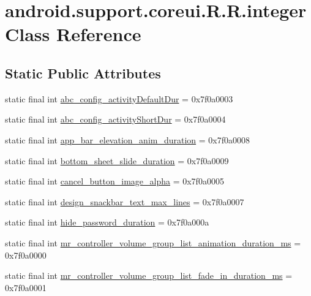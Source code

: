 \hypertarget{classandroid_1_1support_1_1coreui_1_1_r_1_1integer}{
\section{android.support.coreui.R.R.integer Class Reference}
\label{classandroid_1_1support_1_1coreui_1_1_r_1_1integer}
}
\subsection*{Static Public Attributes}
\begin{CompactItemize}
\item 
static final int \hyperlink{classandroid_1_1support_1_1coreui_1_1_r_1_1integer_59ca4c1264f906907cd02a5f4d4d13b5}{abc\_\-config\_\-activityDefaultDur} = 0x7f0a0003
\item 
static final int \hyperlink{classandroid_1_1support_1_1coreui_1_1_r_1_1integer_037e463a6cf6e5259aff87b9f18ffe86}{abc\_\-config\_\-activityShortDur} = 0x7f0a0004
\item 
static final int \hyperlink{classandroid_1_1support_1_1coreui_1_1_r_1_1integer_100a5bdcbcace06f50728466c62e293a}{app\_\-bar\_\-elevation\_\-anim\_\-duration} = 0x7f0a0008
\item 
static final int \hyperlink{classandroid_1_1support_1_1coreui_1_1_r_1_1integer_069d89504d1b43889a4a3048ab080560}{bottom\_\-sheet\_\-slide\_\-duration} = 0x7f0a0009
\item 
static final int \hyperlink{classandroid_1_1support_1_1coreui_1_1_r_1_1integer_3cd1e2c86b38492860d713f5ff6b4c48}{cancel\_\-button\_\-image\_\-alpha} = 0x7f0a0005
\item 
static final int \hyperlink{classandroid_1_1support_1_1coreui_1_1_r_1_1integer_52e34d6cbb38498b13d5fa9e2e5d1458}{design\_\-snackbar\_\-text\_\-max\_\-lines} = 0x7f0a0007
\item 
static final int \hyperlink{classandroid_1_1support_1_1coreui_1_1_r_1_1integer_095dadab67a74458ed210b9a886f2c4f}{hide\_\-password\_\-duration} = 0x7f0a000a
\item 
static final int \hyperlink{classandroid_1_1support_1_1coreui_1_1_r_1_1integer_b551540211ecafb8179dd8f0de72b3a0}{mr\_\-controller\_\-volume\_\-group\_\-list\_\-animation\_\-duration\_\-ms} = 0x7f0a0000
\item 
static final int \hyperlink{classandroid_1_1support_1_1coreui_1_1_r_1_1integer_1283b1b20ce4a814b1ea7e77b9fe693d}{mr\_\-controller\_\-volume\_\-group\_\-list\_\-fade\_\-in\_\-duration\_\-ms} = 0x7f0a0001

\end{CompactItemize}
